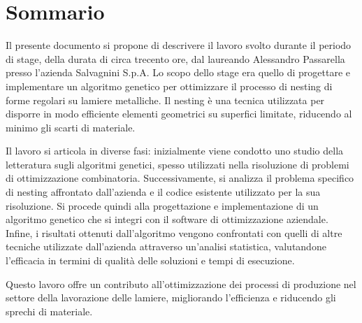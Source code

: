\cleardoublepage
{}
{}
\begingroup
\let\clearpage\relax
\let\cleardoublepage\relax
\let\cleardoublepage\relax

\chapter*{Sommario}

Il presente documento si propone di descrivere il lavoro svolto durante il periodo di stage, della durata di circa trecento ore, dal laureando Alessandro Passarella presso l'azienda Salvagnini S.p.A. Lo scopo dello stage era quello di progettare e implementare un algoritmo genetico per ottimizzare il processo di nesting di forme regolari su lamiere metalliche. Il nesting è una tecnica utilizzata per disporre in modo efficiente elementi geometrici su superfici limitate, riducendo al minimo gli scarti di materiale. 

Il lavoro si articola in diverse fasi: inizialmente viene condotto uno studio della letteratura sugli algoritmi genetici, spesso utilizzati nella risoluzione di problemi di ottimizzazione combinatoria. Successivamente, si analizza il problema specifico di nesting affrontato dall'azienda e il codice esistente utilizzato per la sua risoluzione. Si procede quindi alla progettazione e implementazione di un algoritmo genetico che si integri con il software di ottimizzazione aziendale. Infine, i risultati ottenuti dall'algoritmo vengono confrontati con quelli di altre tecniche utilizzate dall'azienda attraverso un'analisi statistica, valutandone l'efficacia in termini di qualità delle soluzioni e tempi di esecuzione.

Questo lavoro offre un contributo all'ottimizzazione dei processi di produzione nel settore della lavorazione delle lamiere, migliorando l'efficienza e riducendo gli sprechi di materiale.




\endgroup

\vfill
